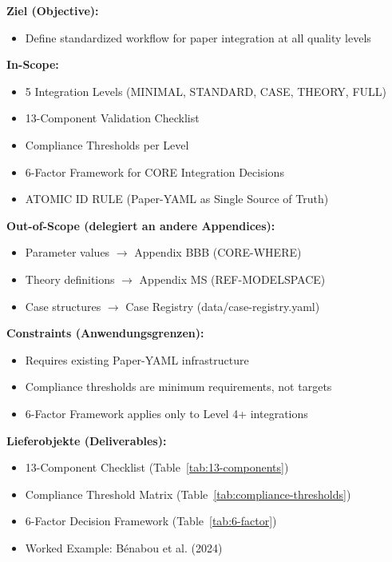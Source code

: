 \begin{tcolorbox}[
    colback=orange!5!white,
    colframe=orange!75!black,
    title={\textbf{Appendix Scope: Ziel / In-Scope / Out-of-Scope / Constraints}},
    fonttitle=\bfseries
]

\textbf{Ziel (Objective):}
\begin{itemize}[nosep]
    \item Define standardized workflow for paper integration at all quality levels
\end{itemize}

\textbf{In-Scope:}
\begin{itemize}[nosep]
    \item 5 Integration Levels (MINIMAL, STANDARD, CASE, THEORY, FULL)
    \item 13-Component Validation Checklist
    \item Compliance Thresholds per Level
    \item 6-Factor Framework for CORE Integration Decisions
    \item ATOMIC ID RULE (Paper-YAML as Single Source of Truth)
\end{itemize}

\textbf{Out-of-Scope (delegiert an andere Appendices):}
\begin{itemize}[nosep]
    \item Parameter values $\rightarrow$ Appendix BBB (CORE-WHERE)
    \item Theory definitions $\rightarrow$ Appendix MS (REF-MODELSPACE)
    \item Case structures $\rightarrow$ Case Registry (data/case-registry.yaml)
\end{itemize}

\textbf{Constraints (Anwendungsgrenzen):}
\begin{itemize}[nosep]
    \item Requires existing Paper-YAML infrastructure
    \item Compliance thresholds are minimum requirements, not targets
    \item 6-Factor Framework applies only to Level 4+ integrations
\end{itemize}

\textbf{Lieferobjekte (Deliverables):}
\begin{itemize}[nosep]
    \item 13-Component Checklist (Table~\ref{tab:13-components})
    \item Compliance Threshold Matrix (Table~\ref{tab:compliance-thresholds})
    \item 6-Factor Decision Framework (Table~\ref{tab:6-factor})
    \item Worked Example: Bénabou et al. (2024)
\end{itemize}

\end{tcolorbox}


